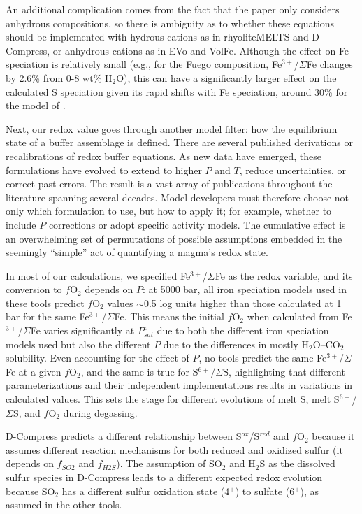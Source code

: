 \documentclass[draft, english]{volcanica-template}
\begin{document}
An additional complication comes from the fact that the \textcite{Kress1991} paper only considers anhydrous compositions, so there is ambiguity as to whether these equations should be implemented with hydrous cations as in rhyoliteMELTS \parencite{GhiorsoGualda2015} and D-Compress, or anhydrous cations as in EVo and VolFe. Although the effect on Fe speciation is relatively small (e.g., for the Fuego composition, Fe$^{3+}$/$\Sigma$Fe changes by 2.6\% from 0-8 wt\% H$_2$O), this can have a significantly larger effect on the calculated S speciation given its rapid shifts with Fe speciation, around 30\% for the model of \textcite{Nash2019}.

Next, our redox value goes through another model filter: how the equilibrium state of a buffer assemblage is defined. There are several published derivations or recalibrations of redox buffer equations. As new data have emerged, these formulations have evolved to extend to higher $P$ and $T$, reduce uncertainties, or correct past errors. The result is a vast array of publications throughout the literature spanning several decades. Model developers must therefore choose not only which formulation to use, but how to apply it; for example, whether to include $P$ corrections or adopt specific activity models. The cumulative effect is an overwhelming set of permutations of possible assumptions embedded in the seemingly ``simple'' act of quantifying a magma’s redox state.

In most of our calculations, we specified Fe$^{3+}$/$\Sigma$Fe as the redox variable, and its conversion to $f$O$_2$ depends on $P$: at 5000 bar, all iron speciation models used in these tools predict $f$O$_2$ values $\sim$0.5 log units higher than those calculated at 1 bar for the same Fe$^{3+}$/$\Sigma$Fe. This means the initial $f$O$_2$ when calculated from Fe$^{3+}$/$\Sigma$Fe varies significantly at $P^v_{sat}$ due to both the different iron speciation models used but also the different $P$ due to the differences in mostly H$_2$O–CO$_2$ solubility. Even accounting for the effect of $P$, no tools predict the same Fe$^{3+}$/$\Sigma$Fe at a given $f$O$_2$, and the same is true for S$^{6+}$/$\Sigma$S, highlighting that different parameterizations and their independent implementations results in variations in calculated values. This sets the stage for different evolutions of melt S, melt S$^{6+}$/$\Sigma$S, and $f$O$_2$ during degassing.

D-Compress predicts a different relationship between S$^{ox}$/S$^{red}$ and $f$O$_2$ because it assumes different reaction mechanisms for both reduced and oxidized sulfur (it depends on $f_{SO2}$ and $f_{H2S}$). The assumption of SO$_2$ and H$_2$S as the dissolved sulfur species in D-Compress leads to a different expected redox evolution because SO$_2$ has a different sulfur oxidation state (4$^+$) to sulfate (6$^+$), as assumed in the other tools. 
\end{document}
